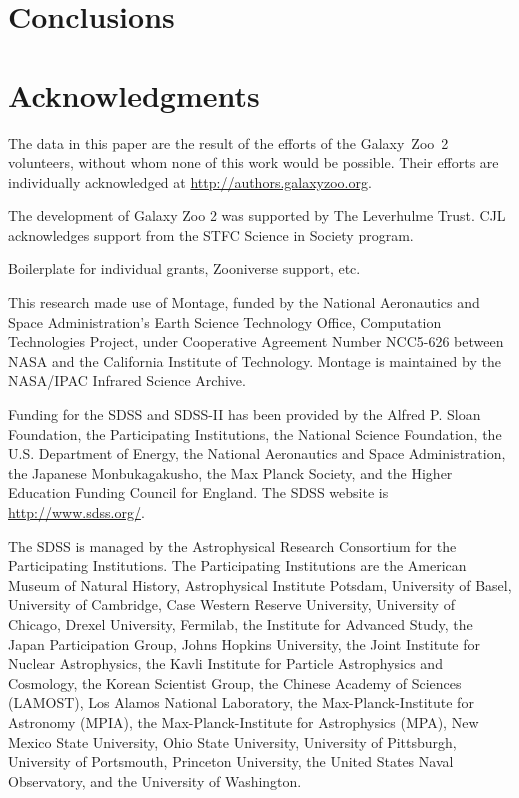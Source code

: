 \documentclass[useAMS,usenatbib]{mn2e}
\begin{document}
\section{Conclusions}\label{sec-conclusion}


\section*{Acknowledgments}
The data in this paper are the result of the efforts of the Galaxy~Zoo~2 volunteers, without whom none of this work would be possible. Their efforts are individually acknowledged at \url{http://authors.galaxyzoo.org}. 

The development of Galaxy Zoo 2 was supported by The Leverhulme Trust. CJL acknowledges support from the STFC Science in Society program. 

Boilerplate for individual grants, Zooniverse support, etc.

This research made use of Montage, funded by the National Aeronautics and Space Administration's Earth Science Technology Office, Computation Technologies Project, under Cooperative Agreement Number NCC5-626 between NASA and the California Institute of Technology. Montage is maintained by the NASA/IPAC Infrared Science Archive.

Funding for the SDSS and SDSS-II has been provided by the Alfred P. Sloan Foundation, the Participating Institutions, the National Science Foundation, the U.S. Department of Energy, the National Aeronautics and Space Administration, the Japanese Monbukagakusho, the Max Planck Society, and the Higher Education Funding Council for England. The SDSS website is \url{http://www.sdss.org/}.

The SDSS is managed by the Astrophysical Research Consortium for the Participating Institutions. The Participating Institutions are the American Museum of Natural History, Astrophysical Institute Potsdam, University of Basel, University of Cambridge, Case Western Reserve University, University of Chicago, Drexel University, Fermilab, the Institute for Advanced Study, the Japan Participation Group, Johns Hopkins University, the Joint Institute for Nuclear Astrophysics, the Kavli Institute for Particle Astrophysics and Cosmology, the Korean Scientist Group, the Chinese Academy of Sciences (LAMOST), Los Alamos National Laboratory, the Max-Planck-Institute for Astronomy (MPIA), the Max-Planck-Institute for Astrophysics (MPA), New Mexico State University, Ohio State University, University of Pittsburgh, University of Portsmouth, Princeton University, the United States Naval Observatory, and the University of Washington.
\end{document}
